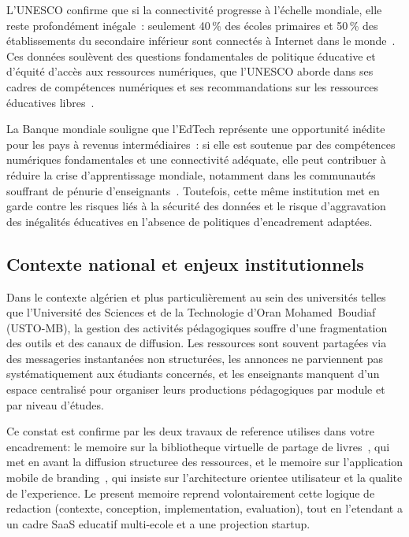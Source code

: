 ﻿\documentclass[12pt,a4paper,oneside]{report}
\begin{document}
L'UNESCO confirme que si la connectivit\'e progresse \`a l'\'echelle mondiale, elle reste profond\'ement in\'egale~: seulement 40\,\% des \'ecoles primaires et 50\,\% des \'etablissements du secondaire inf\'erieur sont connect\'es \`a Internet dans le monde~\cite{unesco_gem_2023}. Ces donn\'ees soul\`event des questions fondamentales de politique \'educative et d'\'equit\'e d'acc\`es aux ressources num\'eriques, que l'UNESCO aborde dans ses cadres de comp\'etences num\'eriques et ses recommandations sur les ressources \'educatives libres~\cite{unesco_oer_2019,unesco_digital_2026}.

La Banque mondiale souligne que l'EdTech repr\'esente une opportunit\'e in\'edite pour les pays \`a revenus interm\'ediaires~: si elle est soutenue par des comp\'etences num\'eriques fondamentales et une connectivit\'e ad\'equate, elle peut contribuer \`a r\'eduire la crise d'apprentissage mondiale, notamment dans les communaut\'es souffrant de p\'enurie d'enseignants~\cite{worldbank_edtech_2026}. Toutefois, cette m\^eme institution met en garde contre les risques li\'es \`a la s\'ecurit\'e des donn\'ees et le risque d'aggravation des in\'egalit\'es \'educatives en l'absence de politiques d'encadrement adapt\'ees.

\subsection{Contexte national et enjeux institutionnels}

Dans le contexte alg\'erien et plus particuli\`erement au sein des universit\'es telles que l'Universit\'e des Sciences et de la Technologie d'Oran Mohamed~Boudiaf (USTO-MB), la gestion des activit\'es p\'edagogiques souffre d'une fragmentation des outils et des canaux de diffusion. Les ressources sont souvent partag\'ees via des messageries instantan\'ees non structur\'ees, les annonces ne parviennent pas syst\'ematiquement aux \'etudiants concern\'es, et les enseignants manquent d'un espace centralis\'e pour organiser leurs productions p\'edagogiques par module et par niveau d'\'etudes.

Ce constat est confirme par les deux travaux de reference utilises dans votre encadrement: le memoire sur la bibliotheque virtuelle de partage de livres~\cite{memoire_bibliotheque_2025}, qui met en avant la diffusion structuree des ressources, et le memoire sur l'application mobile de branding~\cite{memoire_branding_2025}, qui insiste sur l'architecture orientee utilisateur et la qualite de l'experience. Le present memoire reprend volontairement cette logique de redaction (contexte, conception, implementation, evaluation), tout en l'etendant a un cadre SaaS educatif multi-ecole et a une projection startup.
\end{document}
